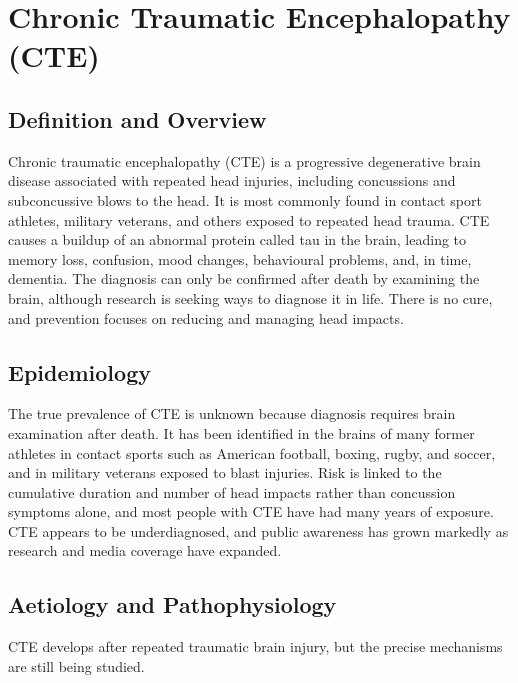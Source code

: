 \chapter{Chronic Traumatic Encephalopathy (CTE)}

\section*{Definition and Overview}
Chronic traumatic encephalopathy (CTE) is a progressive degenerative brain disease associated with repeated head injuries, including concussions and subconcussive blows to the head. It is most commonly found in contact sport athletes, military veterans, and others exposed to repeated head trauma. CTE causes a buildup of an abnormal protein called tau in the brain, leading to memory loss, confusion, mood changes, behavioural problems, and, in time, dementia. The diagnosis can only be confirmed after death by examining the brain, although research is seeking ways to diagnose it in life. There is no cure, and prevention focuses on reducing and managing head impacts.

\section*{Epidemiology}
The true prevalence of CTE is unknown because diagnosis requires brain examination after death. It has been identified in the brains of many former athletes in contact sports such as American football, boxing, rugby, and soccer, and in military veterans exposed to blast injuries. Risk is linked to the cumulative duration and number of head impacts rather than concussion symptoms alone, and most people with CTE have had many years of exposure. CTE appears to be underdiagnosed, and public awareness has grown markedly as research and media coverage have expanded.

\section*{Aetiology and Pathophysiology}
CTE develops after repeated traumatic brain injury, but the precise mechanisms are still being studied.


